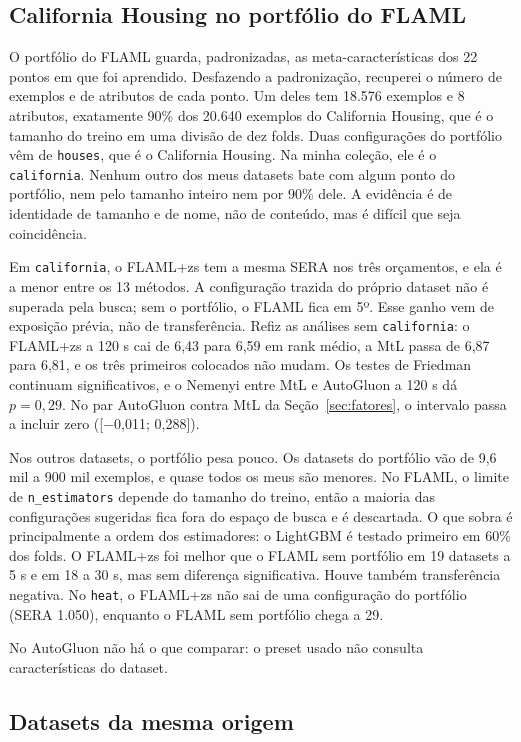 \documentclass[10pt,a4paper]{article}
\begin{document}
\subsection*{California Housing no portfólio do FLAML}

O portfólio do FLAML guarda, padronizadas, as meta-características dos 22 pontos em que foi aprendido. Desfazendo a padronização, recuperei o número de exemplos e de atributos de cada ponto. Um deles tem 18.576 exemplos e 8 atributos, exatamente 90\% dos 20.640 exemplos do California Housing, que é o tamanho do treino em uma divisão de dez folds. Duas configurações do portfólio vêm de \texttt{houses}, que é o California Housing. Na minha coleção, ele é o \texttt{california}. Nenhum outro dos meus datasets bate com algum ponto do portfólio, nem pelo tamanho inteiro nem por 90\% dele. A evidência é de identidade de tamanho e de nome, não de conteúdo, mas é difícil que seja coincidência.

Em \texttt{california}, o FLAML+zs tem a mesma SERA nos três orçamentos, e ela é a menor entre os 13 métodos. A configuração trazida do próprio dataset não é superada pela busca; sem o portfólio, o FLAML fica em 5º. Esse ganho vem de exposição prévia, não de transferência. Refiz as análises sem \texttt{california}: o FLAML+zs a 120 s cai de 6,43 para 6,59 em rank médio, a MtL passa de 6,87 para 6,81, e os três primeiros colocados não mudam. Os testes de Friedman continuam significativos, e o Nemenyi entre MtL e AutoGluon a 120 s dá $p=0{,}29$. No par AutoGluon contra MtL da Seção~\ref{sec:fatores}, o intervalo passa a incluir zero ([$-$0,011; 0,288]).

Nos outros datasets, o portfólio pesa pouco. Os datasets do portfólio vão de 9,6 mil a 900 mil exemplos, e quase todos os meus são menores. No FLAML, o limite de \texttt{n\_estimators} depende do tamanho do treino, então a maioria das configurações sugeridas fica fora do espaço de busca e é descartada. O que sobra é principalmente a ordem dos estimadores: o LightGBM é testado primeiro em 60\% dos folds. O FLAML+zs foi melhor que o FLAML sem portfólio em 19 datasets a 5 s e em 18 a 30 s, mas sem diferença significativa. Houve também transferência negativa. No \texttt{heat}, o FLAML+zs não sai de uma configuração do portfólio (SERA 1.050), enquanto o FLAML sem portfólio chega a 29.

No AutoGluon não há o que comparar: o preset usado não consulta características do dataset.

\subsection*{Datasets da mesma origem}
\end{document}
